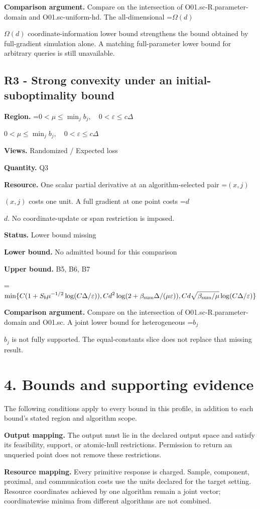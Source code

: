 \documentclass[10pt,a4paper]{article}
\newcommand{\AtlasMath}[1]{\par\begingroup\centering\setbox0=\hbox{$\displaystyle #1$}\ifdim\wd0>1.4\linewidth\typeout{ATLAS WIDE FORMULA: \the\wd0}\fi\ifdim\wd0>\linewidth\resizebox{\linewidth}{!}{\box0}\else\box0\fi\par\endgroup}
\newcommand{\AtlasInlineMath}[1]{\begingroup\setbox0=\hbox{$#1$}\ifdim\wd0>.4\linewidth\endgroup\AtlasMath{#1}\else\endgroup$#1$\fi}
\begin{document}
\textbf{Comparison argument.} Compare on the intersection of O01.sc-R.parameter-domain and O01.sc-uniform-hd. The all-dimensional \AtlasInlineMath{\Omega(d)} coordinate-information lower bound strengthens the bound obtained by full-gradient simulation alone. A matching full-parameter lower bound for arbitrary queries is still unavailable.

\subsection{R3 - Strong convexity under an initial-suboptimality bound}
\textbf{Region.} \AtlasInlineMath{0<\mu\le\min_jb_j,\quad0<\varepsilon\le c\Delta}

\textbf{Views.} Randomized / Expected loss

\textbf{Quantity.} Q3

\textbf{Resource.} One scalar partial derivative at an algorithm-selected pair \AtlasInlineMath{(x,j)} costs one unit. A full gradient at one point costs \AtlasInlineMath{d}. No coordinate-update or span restriction is imposed.

\textbf{Status.} Lower bound missing

\textbf{Lower bound.} No admitted bound for this comparison

\textbf{Upper bound.} B5, B6, B7

\AtlasMath{\min\{C(1+S_b\mu^{-1/2}\log(C\Delta/\varepsilon)),Cd^2\log(2+\beta_{\rm sum}\Delta/(\mu\varepsilon)),Cd\sqrt{\beta_{\rm sum}/\mu}\log(C\Delta/\varepsilon)\}}
\textbf{Comparison argument.} Compare on the intersection of O01.sc-R.parameter-domain and O01.sc. A joint lower bound for heterogeneous \AtlasInlineMath{b_j} is not fully supported. The equal-constants slice does not replace that missing result.

\section{4. Bounds and supporting evidence}
The following conditions apply to every bound in this profile, in addition to each bound's stated region and algorithm scope.

\textbf{Output mapping.} The output must lie in the declared output space and satisfy its feasibility, support, or atomic-hull restrictions. Permission to return an unqueried point does not remove these restrictions.

\textbf{Resource mapping.} Every primitive response is charged. Sample, component, proximal, and communication costs use the units declared for the target setting. Resource coordinates achieved by one algorithm remain a joint vector; coordinatewise minima from different algorithms are not combined.
\end{document}
